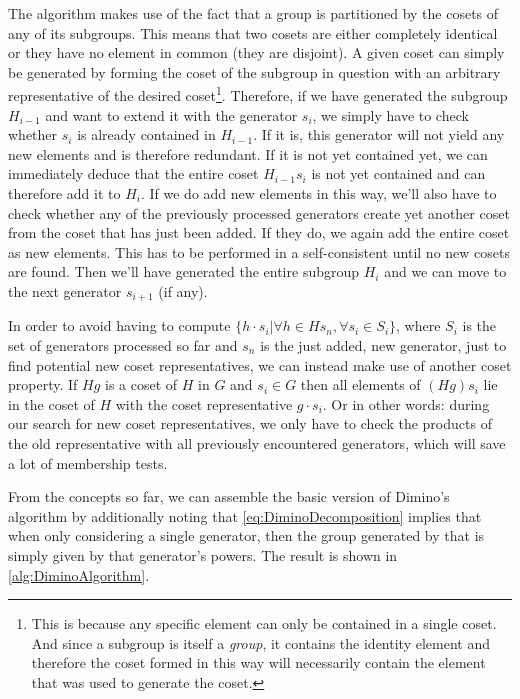\documentclass[parskip=half]{scrartcl}
\begin{document}
	The algorithm makes use of the fact that a group is partitioned by the cosets of any of its subgroups.\supercite{Butler1991a} This means that two
	cosets are either completely identical or they have no element in common (they are disjoint). A given coset can simply be generated by forming the
	coset of the subgroup in question with an arbitrary representative of the desired coset\footnote{This is because any specific element can only be
		contained in a single coset. And since a subgroup is itself a \emph{group}, it contains the identity element and therefore the coset formed in
	this way will necessarily contain the element that was used to generate the coset.}. Therefore, if we have generated the subgroup $H_{i-1}$ and
	want to extend it with the generator $s_i$, we simply have to check whether $s_i$ is already contained in $H_{i-1}$. If it is, this generator will
	not yield any new elements and is therefore redundant. If it is not yet contained yet, we can immediately deduce that the entire coset $H_{i-1}
	s_i$ is not yet contained and can therefore add it to $H_i$. If we do add new elements in this way, we'll also have to check whether any of the
	previously processed generators create yet another coset from the coset that has just been added. If they do, we again add the entire coset as new
	elements. This has to be performed in a self-consistent until no new cosets are found. Then we'll have generated the entire subgroup $H_i$ and we
	can move to the next generator $s_{i+1}$ (if any).

	In order to avoid having to compute $\{ h \cdot s_i | \forall h \in H s_n, \forall s_i \in S_i \}$, where $S_i$ is the set of generators processed so
	far and $s_n$ is the just added, new generator, just to find potential new coset representatives, we can instead make use of another coset
	property. If $Hg$ is a coset of $H$ in $G$ and $s_i \in G$ then all elements of $(Hg)s_i$ lie in the coset of $H$ with the coset representative $g
	\cdot s_i$.\supercite{Butler1991a} Or in other words: during our search for new coset representatives, we only have to check the products of the
	old representative with all previously encountered generators, which will save a lot of membership tests.

	From the concepts so far, we can assemble the basic version of Dimino's algorithm by additionally noting that \cref{eq:DiminoDecomposition}
	implies that when only considering a single generator, then the group generated by that is simply given by that generator's
	powers.\supercite{Butler1991a} The result is shown in \cref{alg:DiminoAlgorithm}.
\end{document}
